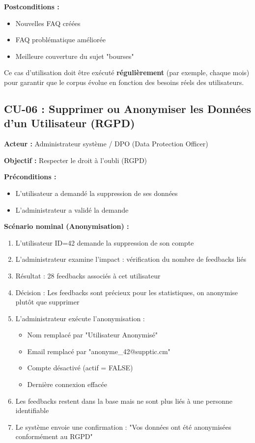 \documentclass[11pt,a4paper]{article}
\begin{document}
\textbf{Postconditions :}
\begin{itemize}
    \item Nouvelles FAQ créées
    \item FAQ problématique améliorée
    \item Meilleure couverture du sujet "bourses"
\end{itemize}

\begin{info}
Ce cas d'utilisation doit être exécuté \textbf{régulièrement} (par exemple, chaque mois) pour garantir que le corpus évolue en fonction des besoins réels des utilisateurs.
\end{info}

\clearpage

\subsection{CU-06 : Supprimer ou Anonymiser les Données d'un Utilisateur (RGPD)}

\textbf{Acteur :} Administrateur système / DPO (Data Protection Officer)

\textbf{Objectif :} Respecter le droit à l'oubli (RGPD)

\textbf{Préconditions :}
\begin{itemize}
    \item L'utilisateur a demandé la suppression de ses données
    \item L'administrateur a validé la demande
\end{itemize}

\textbf{Scénario nominal (Anonymisation) :}

\begin{enumerate}
    \item L'utilisateur ID=42 demande la suppression de son compte
    \item L'administrateur examine l'impact : vérification du nombre de feedbacks liés
    \item Résultat : 28 feedbacks associés à cet utilisateur
    \item Décision : Les feedbacks sont précieux pour les statistiques, on anonymise plutôt que supprimer
    \item L'administrateur exécute l'anonymisation :
    \begin{itemize}
        \item Nom remplacé par "Utilisateur Anonymisé"
        \item Email remplacé par "anonyme\_42@supptic.cm"
        \item Compte désactivé (actif = FALSE)
        \item Dernière connexion effacée
    \end{itemize}
    \item Les feedbacks restent dans la base mais ne sont plus liés à une personne identifiable
    \item Le système envoie une confirmation : "Vos données ont été anonymisées conformément au RGPD"
\end{enumerate}
\end{document}
